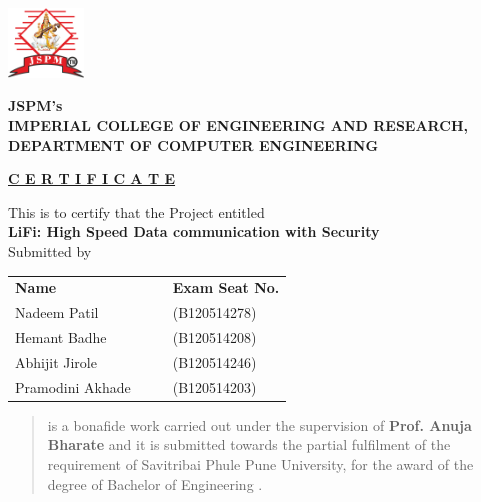 \documentclass[12pt,a4paper]
{article}
\numberwithin{table}{section}
\begin{document}
\begin{center}
\includegraphics[width=2cm]{logo.JPG}
\end{center}
\begin{center}
{\bf JSPM's\\
IMPERIAL COLLEGE OF ENGINEERING AND RESEARCH,\\
	   DEPARTMENT OF COMPUTER ENGINEERING\\}
\end{center}
\vspace{0.2in}
\begin{center}
\textbf{\underline{{\LARGE {\color{blue}C E R T I F I C A T E}}}}
\vspace{0.1in}
\end{center}
		\noindent
  				\setlength{\baselineskip}{1.2\baselineskip}
	\begin{center}
This is to certify that the Project entitled\\
		\textbf{\large LiFi: High Speed Data communication with Security}\\
\singlespace
Submitted by \\
	\begin{table}[htbp]
\begin{center}
\begin{tabular}{l c c l}
\large\bf{Name} & & & \large\bf{Exam Seat No.}\\[0.3cm]
\large{Nadeem Patil } & & & \large{(B120514278)} \\
\large{Hemant Badhe } & & & \large{(B120514208)}\\
\large{Abhijit Jirole } & & & \large{(B120514246)}\\
\large{Pramodini Akhade } & & & \large{(B120514203)}\\
\end{tabular}
\end{center}
\end{table}
	\end{center}
\begin{quote}
is a bonafide work carried out under the supervision of \textbf{Prof. Anuja Bharate} and it is
submitted towards the partial fulfilment of the requirement of Savitribai Phule Pune\linebreak
University, for the award of the degree of  Bachelor of Engineering .\end{quote}		
\end{document}
